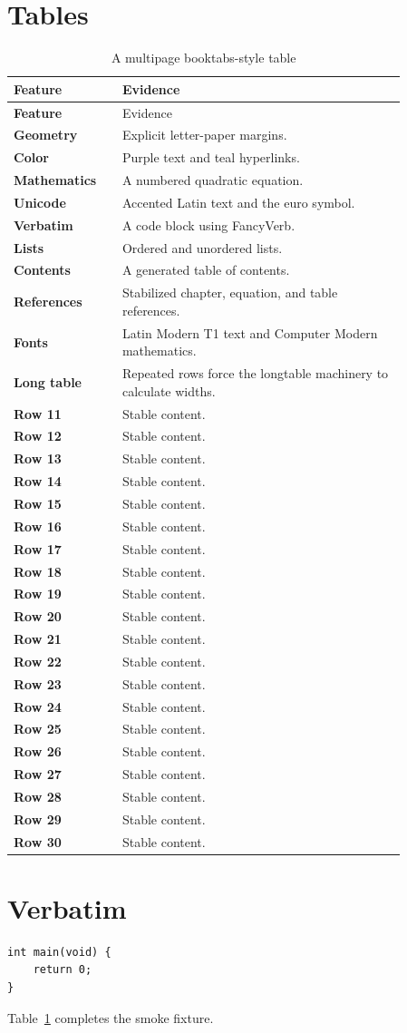\documentclass[10pt,letterpaper,openany]{report}
\begin{document}
\section{Tables}
\begin{longtable}{>{\bfseries}p{0.23\linewidth}p{0.63\linewidth}}
\caption{A multipage booktabs-style table}\label{tab:long}\\
\toprule
Feature & Evidence \\
\midrule
\endfirsthead
\toprule
Feature & Evidence \\
\midrule
\endhead
Geometry & Explicit letter-paper margins. \\
Color & Purple text and teal hyperlinks. \\
Mathematics & A numbered quadratic equation. \\
Unicode & Accented Latin text and the euro symbol. \\
Verbatim & A code block using FancyVerb. \\
Lists & Ordered and unordered lists. \\
Contents & A generated table of contents. \\
References & Stabilized chapter, equation, and table references. \\
Fonts & Latin Modern T1 text and Computer Modern mathematics. \\
Long table & Repeated rows force the longtable machinery to calculate widths. \\
Row 11 & Stable content. \\
Row 12 & Stable content. \\
Row 13 & Stable content. \\
Row 14 & Stable content. \\
Row 15 & Stable content. \\
Row 16 & Stable content. \\
Row 17 & Stable content. \\
Row 18 & Stable content. \\
Row 19 & Stable content. \\
Row 20 & Stable content. \\
Row 21 & Stable content. \\
Row 22 & Stable content. \\
Row 23 & Stable content. \\
Row 24 & Stable content. \\
Row 25 & Stable content. \\
Row 26 & Stable content. \\
Row 27 & Stable content. \\
Row 28 & Stable content. \\
Row 29 & Stable content. \\
Row 30 & Stable content. \\
\bottomrule
\end{longtable}

\section{Verbatim}
\begin{Verbatim}[commandchars=\\\{\}]
int main(void) {
    return 0;
}
\end{Verbatim}

Table~\ref{tab:long} completes the smoke fixture.
\end{document}
